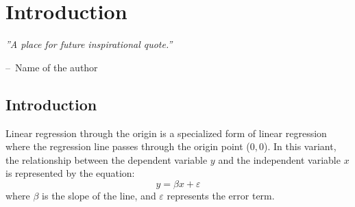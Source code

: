 \documentclass[12pt,a4paper,oneside]{book} %
\makeatletter
\newenvironment{chapquote}[2][2em]
{\setlength{\@tempdima}{#1}%
	\def\chapquote@author{#2}%
	\parshape 1 \@tempdima \dimexpr\textwidth-2\@tempdima\relax%
	\itshape}
{\par\normalfont\hfill--\ \chapquote@author\hspace*{\@tempdima}\par\bigskip}
\newcommand{\hsp}{\hspace{20pt}}
\makeatother
\begin{document}

	\frontmatter
	
	\tableofcontents
	\listoftables
	\listoffigures
		
	\mainmatter
	
	\pagestyle{plain}
	
	\titleformat{\chapter}[display]{\normalfont\huge\bfseries}{\chaptertitlename\ \thechapter}{20pt}{\Huge}
	\titlespacing*{\chapter}{10pt}{20pt}{40pt}
	 
	\titleformat{\chapter}[hang]{\Huge\bfseries}{\thechapter.\hsp}{0pt}{\Huge\bfseries} 
	  
	\chapter{Introduction} 
	
	\begin{chapquote}{Name of the author} %
	''A place for future inspirational quote.''
	\end{chapquote}


	\section{Introduction}

Linear regression through the origin is a specialized form of linear regression where the regression line passes through the origin point (\(0, 0\)). In this variant, the relationship between the dependent variable \(y\) and the independent variable \(x\) is represented by the equation:
\[ y = \beta x + \varepsilon \]
where \(\beta\) is the slope of the line, and \(\varepsilon\) represents the error term.
\end{document}

